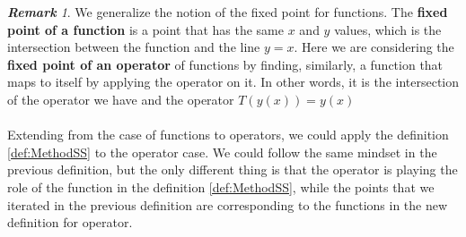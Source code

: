 \documentclass{article}
\theoremstyle{definition}
\theoremstyle{remark}
\newtheorem*{remark}{\textbf{Remark}}
\theoremstyle{example}
\begin{document}
\begin{remark}

We generalize the notion of the fixed point for functions. The \textbf{fixed point of a function} is a point that has the same $x$ and $y$ values, which is the intersection between the function and the line $y = x$. Here we are considering the \textbf{fixed point of an operator} of functions by finding, similarly, a function that maps to itself by applying the operator on it. In other words, it is the intersection of the operator we have and the operator $T(y(x)) = y(x)$

\end{remark}

\paragraph{  }

Extending from the case of functions to operators, we could apply the definition \ref{def:MethodSS} to the operator case. We could follow the same mindset in the previous definition, but the only different thing is that the operator is playing the role of the function in the definition \ref{def:MethodSS}, while the points that we iterated in the previous definition are corresponding to the functions in the new definition for operator.
\end{document}
